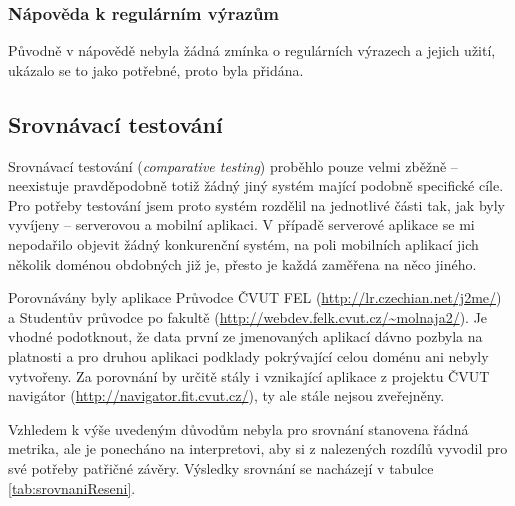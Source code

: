 \subsubsection*{Nápověda k regulárním výrazům}
Původně v nápovědě nebyla žádná zmínka o regulárních výrazech a jejich užití, ukázalo se to jako potřebné, proto byla přidána.


\subsection{Srovnávací testování}
Srovnávací testování (\textit{comparative testing}) proběhlo pouze velmi zběžně -- neexistuje pravděpodobně totiž žádný jiný systém mající podobně specifické cíle. Pro potřeby testování jsem proto systém rozdělil na jednotlivé části tak, jak byly vyvíjeny -- serverovou a mobilní aplikaci. V případě serverové aplikace se mi nepodařilo objevit žádný konkurenční systém, na poli mobilních aplikací jich několik doménou obdobných již je, přesto je každá zaměřena na něco jiného.

Porovnávány byly aplikace Průvodce ČVUT FEL (\url{http://lr.czechian.net/j2me/}) a Studentův průvodce po fakultě (\url{http://webdev.felk.cvut.cz/~molnaja2/}). Je vhodné podotknout, že data první ze jmenovaných aplikací dávno pozbyla na platnosti a pro druhou aplikaci podklady pokrývající celou doménu ani nebyly vytvořeny. Za porovnání by určitě stály i vznikající aplikace z projektu ČVUT navigátor (\url{http://navigator.fit.cvut.cz/}), ty ale stále nejsou zveřejněny.

Vzhledem k výše uvedeným důvodům nebyla pro srovnání stanovena řádná metrika, ale je ponecháno na interpretovi, aby si z nalezených rozdílů vyvodil pro své potřeby patřičné závěry. Výsledky srovnání se nacházejí v tabulce \ref{tab:srovnaniReseni}.

